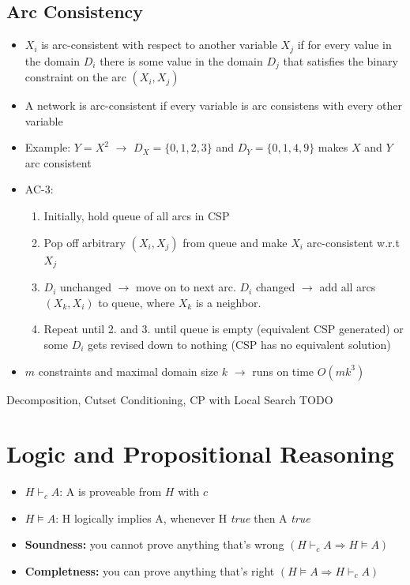 \documentclass{scrartcl}
\begin{document}
\subsection{Arc Consistency}
\begin{itemize}
    \item
        $X_i$ is arc-consistent with respect to another variable $X_j$ if for every value in the domain $D_i$ there is some value in the domain $D_j$ that satisfies the binary constraint on the arc $(X_i, X_j)$ 
    \item
        A network is arc-consistent if every variable is arc consistens with every other variable
    \item
        Example: $Y = X^2$ $\rightarrow$ $D_X = \{0,1,2,3\}$ and $D_Y = \{0,1,4,9\}$ makes $X$ and $Y$ arc consistent
    \item
        AC-3:
        \begin{enumerate}
            \item
                Initially, hold queue of all arcs in CSP 
            \item
                Pop off arbitrary $(X_i, X_j)$ from queue and make $X_i$ arc-consistent w.r.t $X_j$
            \item
                $D_i$ unchanged $\rightarrow$ move on to next arc. $D_i$ changed $\rightarrow$ add all arcs $(X_k, X_i)$ to queue, where $X_k$ is a neighbor.
            \item
                Repeat until 2. and 3. until queue is empty (equivalent CSP generated) or some $D_i$ gets revised down to nothing (CSP has no equivalent solution)
        \end{enumerate}
    \item
        $m$ constraints and maximal domain size $k$ $\rightarrow$ runs on time $O(m k ^3)$
\end{itemize}
Decomposition, Cutset Conditioning, CP with Local Search TODO

\section{Logic and Propositional Reasoning}
\begin{itemize}
    \item
        $H \vdash_c A$: A is proveable from $H$ with $c$
    \item
        $H \vDash A$: H logically implies A, whenever H \textit{true} then A \textit{true}
    \item
        \textbf{Soundness:} you cannot prove anything that's wrong $(H \vdash_c A \Rightarrow H \vDash A)$
    \item
        \textbf{Completness:} you can prove anything that's right $(H \vDash A \Rightarrow H \vdash_c A)$
\end{itemize}
\end{document}

